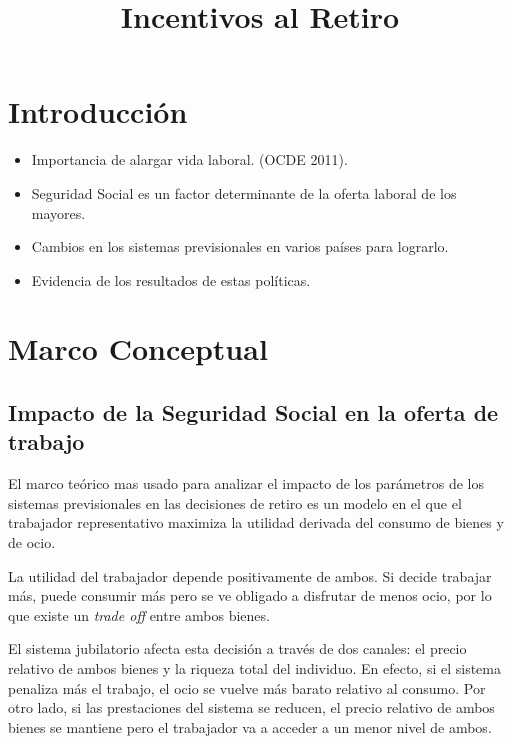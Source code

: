 \documentclass[]{article}
\title{Incentivos al Retiro}
\author{}
\date{\vspace{-2.5em}}
\providecommand{\tightlist}{%
  \setlength{\itemsep}{0pt}\setlength{\parskip}{0pt}}
\begin{document}
\maketitle

{
\setcounter{tocdepth}{3}
\tableofcontents
}
\hypertarget{introducciuxf3n}{%
\section{Introducción}\label{introducciuxf3n}}

\begin{itemize}
\tightlist
\item
  Importancia de alargar vida laboral. (OCDE 2011).
\item
  Seguridad Social es un factor determinante de la oferta laboral de los
  mayores.
\item
  Cambios en los sistemas previsionales en varios países para lograrlo.
\item
  Evidencia de los resultados de estas políticas.
\end{itemize}

\hypertarget{marco-conceptual}{%
\section{Marco Conceptual}\label{marco-conceptual}}

\hypertarget{impacto-de-la-seguridad-social-en-la-oferta-de-trabajo}{%
\subsection{Impacto de la Seguridad Social en la oferta de
trabajo}\label{impacto-de-la-seguridad-social-en-la-oferta-de-trabajo}}

El marco teórico mas usado para analizar el impacto de los parámetros de
los sistemas previsionales en las decisiones de retiro es un modelo en
el que el trabajador representativo maximiza la utilidad derivada del
consumo de bienes y de ocio.

La utilidad del trabajador depende positivamente de ambos. Si decide
trabajar más, puede consumir más pero se ve obligado a disfrutar de
menos ocio, por lo que existe un \emph{trade off} entre ambos bienes.

El sistema jubilatorio afecta esta decisión a través de dos canales: el
precio relativo de ambos bienes y la riqueza total del individuo. En
efecto, si el sistema penaliza más el trabajo, el ocio se vuelve más
barato relativo al consumo. Por otro lado, si las prestaciones del
sistema se reducen, el precio relativo de ambos bienes se mantiene pero
el trabajador va a acceder a un menor nivel de ambos.
\end{document}
